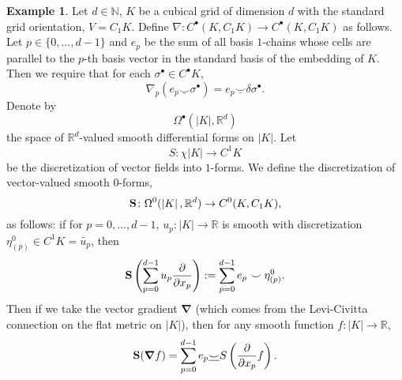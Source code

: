 \documentclass[fleqn]{article}
\theoremstyle{definition}
\newtheorem{example}[theorem]{Example}
\newcommand{\N}{\mathbb{N}}
\newcommand{\R}{\mathbb{R}}
\newcommand{\abs}[1]{\left\lvert#1\right\rvert}
\newcommand{\usmile}{\underline{\smile}}
\begin{document}
\begin{example}
  Let
    $d \in \N$,
    $K$ be a cubical grid of dimension $d$ with the standard grid orientation,
    $V = C_1 K$.
  Define $\nabla \colon C^\bullet(K, C_1 K) \to C^\bullet(K, C_1 K)$ as follows.
  Let $p \in \{0, ..., d - 1\}$ and $e_p$ be the sum of all basis $1$-chains
  whose cells are parallel to the $p$-th basis vector in the standard basis of
  the embedding of $K$.
  Then we require that for each $\sigma^\bullet \in C^\bullet K$,
  \begin{equation}
    \nabla_p(e_p \usmile \sigma^\bullet) = e_p \usmile \delta \sigma^\bullet.
  \end{equation}
  Denote by
  \begin{equation}
    \Omega^\bullet(\abs{K}, \R^d)
  \end{equation}
  the space of $\R^d$-valued smooth differential forms on $\abs{K}$.
  Let
  \begin{equation}
    S \colon \chi \abs{K} \to C^1 K
  \end{equation}
  be the discretization of vector fields into $1$-forms.
  We define the discretization of vector-valued smooth $0$-forms,
  \begin{equation}
    {\bf S} \colon \Omega^0(\abs{K}, \R^d) \to C^0(K, C_1 K),
  \end{equation}
  as follows: if for $p = 0, ..., d - 1$,
  $u_p \colon \abs{K} \to \R$ is smooth with discretization
  $\eta_{(p)}^0 \in C^1 K = \widetilde{u_p}$, then
  \begin{equation}
    {\bf S}\left(\sum_{p = 0}^{d - 1} u_p \frac{\partial}{\partial x_p}\right)
    := \sum_{p = 0}^{d - 1} e_p \smile \eta_{(p)}^0.
  \end{equation}
  Then if we take the vector gradient ${\boldsymbol \nabla}$
  (which comes from the Levi-Civitta connection on the flat metric on
  $\abs{K}$), then for any smooth function $f \colon \abs{K} \to \R$,
  \begin{equation}
    {\bf S}({\boldsymbol \nabla} f)
    = \sum_{p = 0}^{d - 1}
      e_p \usmile S\left(\frac{\partial}{\partial x_p} f\right).
  \end{equation}
\end{example}
\end{document}
